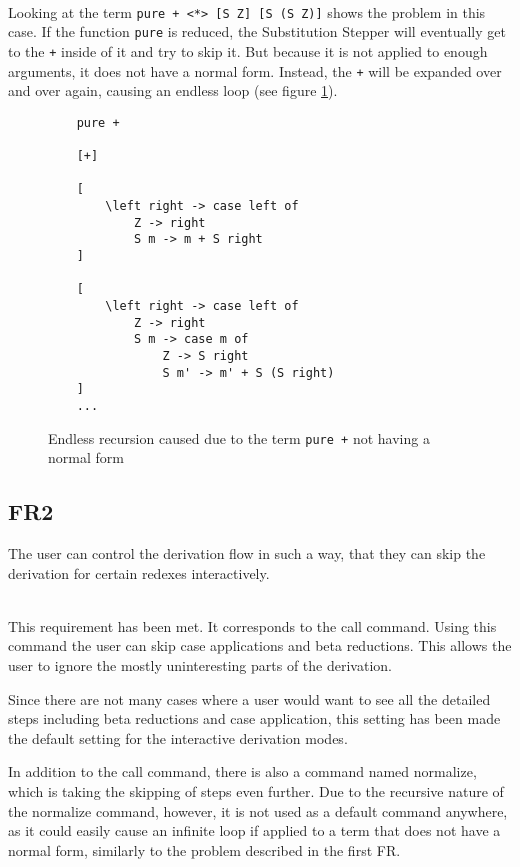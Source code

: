 \ \\
Looking at the term \texttt{pure + <*> [S Z] [S (S Z)]} shows the problem in this case.
If the function \texttt{pure} is reduced,
the Substitution Stepper will eventually get to the \texttt{+} inside of it and try to skip it.
But because it is not applied to enough arguments,
it does not have a normal form.
Instead, the \texttt{+} will be expanded over and over again, causing an endless loop (see figure \ref*{fig:FR1infiniteLoop}).

\begin{figure}[!ht]
\begin{verbatim}
    pure +

    [+]

    [
        \left right -> case left of
            Z -> right
            S m -> m + S right
    ]

    [
        \left right -> case left of
            Z -> right
            S m -> case m of
                Z -> S right
                S m' -> m' + S (S right)
    ]
    ...
\end{verbatim}
    \caption{Endless recursion caused due to the term \texttt{pure +} not having a normal form}
    \label{fig:FR1infiniteLoop}
\end{figure}

\newpage
\subsection{FR2}
The user can control the derivation flow in such a way, that they can skip the derivation for certain redexes interactively.

\ \\
This requirement has been met.
It corresponds to the call command.
Using this command the user can skip case applications and beta reductions.
This allows the user to ignore the mostly uninteresting parts of the derivation.

Since there are not many cases where a user would want to see all the detailed steps including beta reductions and case application,
this setting has been made the default setting for the interactive derivation modes.

In addition to the call command, there is also a command named normalize,
which is taking the skipping of steps even further.
Due to the recursive nature of the normalize command, however,
it is not used as a default command anywhere, as it could easily cause an infinite loop if applied to a term that does not have a normal form,
similarly to the problem described in the first FR.

